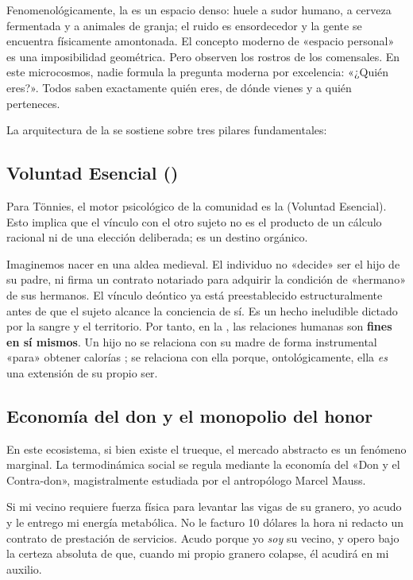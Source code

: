 Fenomenológicamente, la \Gemeinschaft{} es un espacio denso: huele a sudor humano, a cerveza fermentada y a animales de granja; el ruido es ensordecedor y la gente se encuentra físicamente amontonada. El concepto moderno de «espacio personal» es una imposibilidad geométrica. Pero observen los rostros de los comensales. En este microcosmos, nadie formula la pregunta moderna por excelencia: «¿Quién eres?». Todos saben exactamente quién eres, de dónde vienes y a quién perteneces.

La arquitectura de la \Gemeinschaft{} se sostiene sobre tres pilares fundamentales:

\subsection{Voluntad Esencial (\Wesenwille)}
Para Tönnies, el motor psicológico de la comunidad es la \Wesenwille{} (Voluntad Esencial). Esto implica que el vínculo con el otro sujeto no es el producto de un cálculo racional ni de una elección deliberada; es un destino orgánico. 

Imaginemos nacer en una aldea medieval. El individuo no «decide» ser el hijo de su padre, ni firma un contrato notariado para adquirir la condición de «hermano» de sus hermanos. El vínculo deóntico ya está preestablecido estructuralmente antes de que el sujeto alcance la conciencia de sí. Es un hecho ineludible dictado por la sangre y el territorio. Por tanto, en la \Gemeinschaft, las relaciones humanas son \textbf{fines en sí mismos}. Un hijo no se relaciona con su madre de forma instrumental «para» obtener calorías ; se relaciona con ella porque, ontológicamente, ella \textit{es} una extensión de su propio ser.

\subsection{Economía del don y el monopolio del honor}
En este ecosistema, si bien existe el trueque, el mercado abstracto es un fenómeno marginal. La termodinámica social se regula mediante la economía del «Don y el Contra-don», magistralmente estudiada por el antropólogo Marcel Mauss. 

Si mi vecino requiere fuerza física para levantar las vigas de su granero, yo acudo y le entrego mi energía metabólica. No le facturo 10 dólares la hora ni redacto un contrato de prestación de servicios. Acudo porque yo \textit{soy} su vecino, y opero bajo la certeza absoluta de que, cuando mi propio granero colapse, él acudirá en mi auxilio. 

